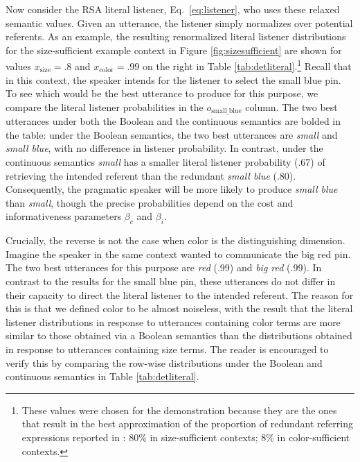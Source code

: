 \documentclass[11pt]{article}
\newcommand{\tableref}[1]{Table \ref{#1}}
\newcommand{\figref}[1]{Figure \ref{#1}}
\begin{document}
Now consider the RSA literal listener, Eq.~\ref{eq:listener}, who uses these relaxed semantic values.
Given an utterance, the listener simply normalizes over potential referents. 
As an example, the resulting renormalized literal listener distributions for the size-sufficient example context in \figref{fig:sizesufficient} are shown for values  $x_{\text{size}} = .8$ and $x_{\text{color}} = .99$ on the right in \tableref{tab:detliteral}.\footnote{These values were chosen for the demonstration because they are the ones that result in the best approximation of the proportion of redundant referring expressions reported in : 80\% in size-sufficient contexts; 8\% in color-sufficient contexts.} Recall that in this context, the speaker intends for the listener to select the small blue pin. To see which would be the best utterance to produce for this purpose, we compare the literal listener probabilities in the $o_{\text{small\_blue}}$ column. The two best utterances under both the Boolean and the continuous semantics are bolded in the table: under the Boolean semantics, the two best utterances are \emph{small} and \emph{small blue}, with no difference in listener probability. In contrast, under the continuous semantics \emph{small} has a smaller literal listener probability (.67) of retrieving the intended referent than the redundant \emph{small blue} (.80). Consequently, the pragmatic speaker will be more likely to produce \emph{small blue} than \emph{small}, though the precise probabilities depend on the cost and informativeness parameters $\beta_c$ and $\beta_i$. 

Crucially, the reverse is not the case when color is the distinguishing dimension. Imagine the speaker in the same context wanted to communicate the big red pin. The two best utterances for this purpose are \emph{red} (.99) and \emph{big red} (.99). In contrast to the results for the small blue pin, these utterances do not differ in their capacity to direct the literal listener to the intended referent. The reason for this is that we defined color to be almost noiseless, with the result that the literal listener distributions in response to utterances containing color terms are more similar to those obtained via a Boolean semantics than the distributions obtained in response to utterances containing size terms. The reader is encouraged to verify this by comparing the row-wise distributions under the  Boolean and continuous semantics in \tableref{tab:detliteral}.
\end{document}
